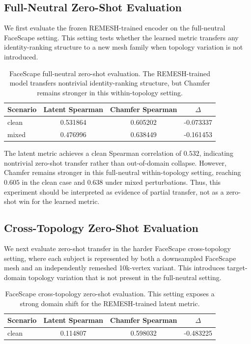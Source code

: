 \documentclass{article}
\begin{document}
\subsection{Full-Neutral Zero-Shot Evaluation}
\label{app:faceverse_full_neutral}

We first evaluate the frozen REMESH-trained encoder on the full-neutral
FaceScape setting. This setting tests whether the learned metric transfers any
identity-ranking structure to a new mesh family when topology variation is not
introduced.

\begin{table}[h]
\centering
\small
\caption{
FaceScape full-neutral zero-shot evaluation. The REMESH-trained model transfers
nontrivial identity-ranking structure, but Chamfer remains stronger in this
within-topology setting.
}
\label{tab:faceverse_full_neutral_app}
\begin{tabular}{lccc}
\toprule
Scenario & Latent Spearman & Chamfer Spearman & $\Delta$ \\
\midrule
clean & 0.531864 & 0.605202 & -0.073337 \\
mixed & 0.476996 & 0.638449 & -0.161453 \\
\bottomrule
\end{tabular}
\end{table}

The latent metric achieves a clean Spearman correlation of $0.532$, indicating
nontrivial zero-shot transfer rather than out-of-domain collapse. However,
Chamfer remains stronger in this full-neutral within-topology setting, reaching
$0.605$ in the clean case and $0.638$ under mixed perturbations. Thus, this
experiment should be interpreted as evidence of partial transfer, not as a
zero-shot win for the learned metric.

\subsection{Cross-Topology Zero-Shot Evaluation}
\label{app:faceverse_xtopo_zeroshot}

We next evaluate zero-shot transfer in the harder FaceScape cross-topology
setting, where each subject is represented by both a downsampled FaceScape mesh
and an independently remeshed 10k-vertex variant. This introduces target-domain
topology variation that is not present in the full-neutral setting.

\begin{table}[h]
\centering
\small
\caption{
FaceScape cross-topology zero-shot evaluation. This setting exposes a strong
domain shift for the REMESH-trained latent metric.
}
\label{tab:faceverse_xtopo_zeroshot_app}
\begin{tabular}{lccc}
\toprule
Scenario & Latent Spearman & Chamfer Spearman & $\Delta$ \\
\midrule
clean & 0.114807 & 0.598032 & -0.483225 \\
\bottomrule
\end{tabular}
\end{table}
\end{document}
